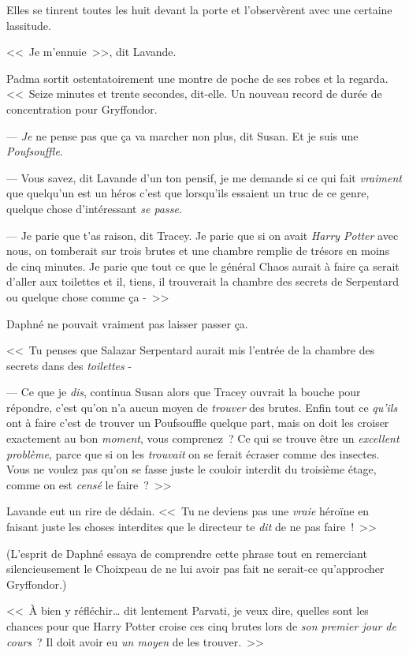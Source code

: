 Elles se tinrent toutes les huit devant la porte et l'observèrent avec une certaine lassitude.

<<~Je m'ennuie~>>, dit Lavande.

Padma sortit ostentatoirement une montre de poche de ses robes et la regarda. <<~Seize minutes et trente secondes, dit-elle. Un nouveau record de durée de concentration pour Gryffondor.

--- \emph{Je} ne pense pas que ça va marcher non plus, dit Susan. Et je suis une \emph{Poufsouffle}.

--- Vous savez, dit Lavande d'un ton pensif, je me demande si ce qui fait \emph{vraiment} que quelqu'un est un héros c'est que lorsqu'ils essaient un truc de ce genre, quelque chose d'intéressant \emph{se passe}.

--- Je parie que t'as raison, dit Tracey. Je parie que si on avait \emph{Harry Potter} avec nous, on tomberait sur trois brutes et une chambre remplie de trésors en moins de cinq minutes. Je parie que tout ce que le général Chaos aurait à faire ça serait d'aller aux toilettes et il, tiens, il trouverait la chambre des secrets de Serpentard ou quelque chose comme ça -~>>

Daphné ne pouvait vraiment pas laisser passer ça.

<<~Tu penses que Salazar Serpentard aurait mis l'entrée de la chambre des secrets dans des \emph{toilettes} -

--- Ce que je \emph{dis}, continua Susan alors que Tracey ouvrait la bouche pour répondre, c'est qu'on n'a aucun moyen de \emph{trouver} des brutes. Enfin tout ce \emph{qu'ils} ont à faire c'est de trouver un Poufsouffle quelque part, mais on doit les croiser exactement au bon \emph{moment}, vous comprenez~? Ce qui se trouve être un \emph{excellent problème}, parce que si on les \emph{trouvait} on se ferait écraser comme des insectes. Vous ne voulez pas qu'on se fasse juste le couloir interdit du troisième étage, comme on est \emph{censé} le faire~?~>>

Lavande eut un rire de dédain. <<~Tu ne deviens pas une \emph{vraie} héroïne en faisant juste les choses interdites que le directeur te \emph{dit} de ne pas faire~!~>>

(L'esprit de Daphné essaya de comprendre cette phrase tout en remerciant silencieusement le Choixpeau de ne lui avoir pas fait ne serait-ce qu'approcher Gryffondor.)

<<~À bien y réfléchir… dit lentement Parvati, je veux dire, quelles sont les chances pour que Harry Potter croise ces cinq brutes lors de \emph{son premier jour de cours}~? Il doit avoir eu \emph{un moyen} de les trouver.~>>

